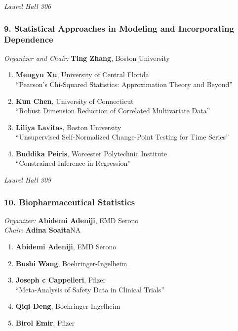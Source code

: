 \emph{Laurel Hall 306} \\[.5em]

\subsubsection*{9. Statistical Approaches in Modeling and Incorporating Dependence}

\emph{Organizer and Chair:} \textbf{Ting Zhang}, Boston University

\begin{enumerate}
\item \textbf{Mengyu Xu}, University of Central Florida \\
``Pearson’s Chi-Squared Statistics: Approximation Theory and Beyond''
\item \textbf{Kun Chen}, University of Connecticut \\
``Robust Dimension Reduction of Correlated Multivariate Data''
\item \textbf{Liliya Lavitas}, Boston University \\
``Unsupervised Self-Normalized Change-Point Testing for Time Series''
\item \textbf{Buddika Peiris}, Worcester Polytechnic Institute \\
``Constrained Inference in Regression''
\end{enumerate}

\emph{Laurel Hall 309} \\[.5em]

\subsubsection*{10. Biopharmaceutical Statistics}

\emph{Organizer:} \textbf{Abidemi Adeniji}, EMD Serono \\
\emph{Chair:} \textbf{Adina Soaita}NA

\begin{enumerate}
\item \textbf{Abidemi Adeniji}, EMD Serono 
\item \textbf{Bushi Wang}, Boehringer-Ingelheim 
\item \textbf{Joseph c Cappelleri}, Pfizer \\
``Meta-Analysis of Safety Data in Clinical Trials''
\item \textbf{Qiqi Deng}, Boehringer Ingelheim 
\item \textbf{Birol Emir}, Pfizer 
\end{enumerate}


